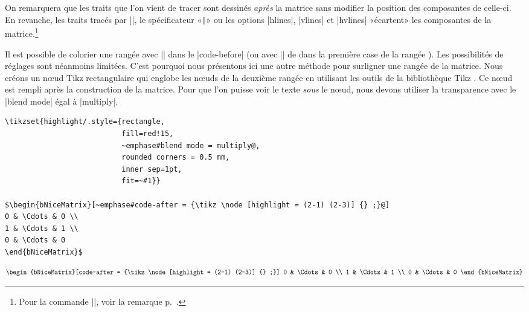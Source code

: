 \documentclass[dvipsnames]{article}%
\begin{document}
On remarquera que les traits que l'on vient de tracer sont dessinés \emph{après}
la matrice sans modifier la position des composantes de celle-ci. En revanche,
les traits tracés par |\hline|, le spécificateur «\verb+|+» ou les options
|hlines|, |vlines| et |hvlines| «écartent» les composantes de la
matrice.\footnote{Pour la commande |\cline|, voir la remarque
  p.~\pageref{remark-cline}.}

\vspace{1cm} Il est possible de colorier une rangée avec |\rowcolor| dans le
|code-before| (ou avec |\rowcolor| de  dans la première case de la
rangée ). Les possibilités de réglages sont néanmoins limitées. C'est pourquoi
nous présentons ici une autre méthode pour surligner une rangée de la matrice.
Nous créons un nœud Tikz rectangulaire qui englobe les nœuds de la deuxième
rangée en utilisant les outils de la bibliothèque Tikz . Ce nœud est
rempli après la construction de la matrice. Pour que l'on puisse voir le texte
\emph{sous} le nœud, nous devons utiliser la transparence avec le |blend mode|
égal à |multiply|.



\medskip
\begin{Verbatim}
\tikzset{highlight/.style={rectangle,
                           fill=red!15,
                           ~emphase#blend mode = multiply@,
                           rounded corners = 0.5 mm, 
                           inner sep=1pt,
                           fit=~#1}}

$\begin{bNiceMatrix}[~emphase#code-after = {\tikz \node [highlight = (2-1) (2-3)] {} ;}@]
0 & \Cdots & 0 \\
1 & \Cdots & 1 \\
0 & \Cdots & 0 
\end{bNiceMatrix}$
\end{Verbatim}

\[\begin{bNiceMatrix}[code-after = {\tikz \node [highlight = (2-1) (2-3)] {} ;}]
0 & \Cdots & 0 \\
1 & \Cdots & 1 \\
0 & \Cdots & 0 
\end{bNiceMatrix}\]
\end{document}
